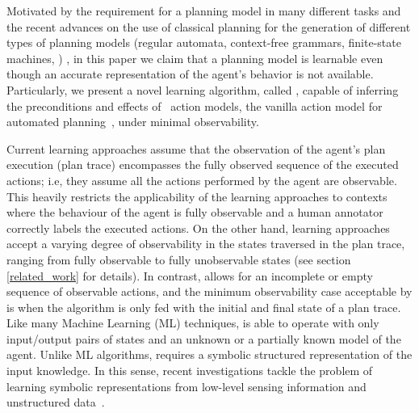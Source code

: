 \textcolor[rgb]{1.00,0.00,0.00}{Motivated by the requirement for a planning model in many different tasks and the recent advances on the use of classical planning for the generation of different types of planning models (regular automata, context-free grammars, finite-state machines, \strips)} \cite{bonet2009automatic,segovia2016generalized,segovia2016hierarchical,segovia2017generating}, in this paper we claim that a planning model is learnable even though an accurate representation of the agent's behavior is not available. Particularly, we present a novel learning algorithm, called \FAMA, capable of inferring the preconditions and effects of \strips\ action models, the vanilla action model for automated planning~\cite{fikes1971strips}, under minimal observability.



\textcolor[rgb]{1.00,0.00,0.00}{Current learning approaches assume that the observation of the agent's plan execution (plan trace) encompasses the fully observed sequence of the executed actions; i.e, they assume all the actions performed by the agent are observable. This heavily restricts the applicability of the learning approaches to contexts where the behaviour of the agent is fully observable and a human annotator correctly labels the executed actions. On the other hand, learning approaches accept a varying degree of observability in the states traversed in the plan trace, ranging from fully observable to fully unobservable states (see section \ref{related_work} for details).} In contrast, \FAMA allows for an incomplete or empty sequence of observable actions, and the minimum observability case acceptable by \FAMA is when the algorithm is only fed with the initial and final state of a plan trace. Like many Machine Learning (ML) techniques, \FAMA is able to operate with only input/output pairs of states and an unknown or a partially known model of the agent. Unlike ML algorithms, \FAMA requires a symbolic structured representation of the input knowledge. In this sense, recent investigations tackle the problem of learning symbolic representations from low-level sensing information and unstructured data~\cite{KonidarisKL18,AsaiF18}.

